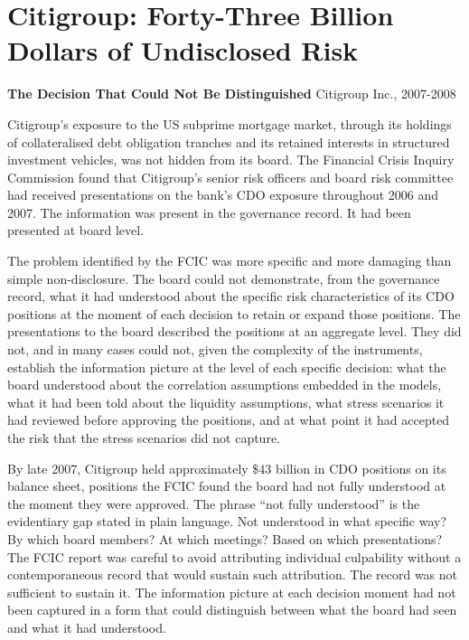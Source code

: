 \scenebreak

\section{Citigroup: Forty-Three Billion Dollars of Undisclosed Risk}

\textbf{The Decision That Could Not Be Distinguished} Citigroup Inc., 2007-2008

Citigroup's exposure to the US subprime mortgage market, through its holdings of collateralised debt obligation tranches and its retained interests in structured investment vehicles, was not hidden from its board. The Financial Crisis Inquiry Commission found that Citigroup's senior risk officers and board risk committee had received presentations on the bank's CDO exposure throughout 2006 and 2007. The information was present in the governance record. It had been presented at board level.

The problem identified by the FCIC was more specific and more damaging than simple non-disclosure. The board could not demonstrate, from the governance record, what it had understood about the specific risk characteristics of its CDO positions at the moment of each decision to retain or expand those positions. The presentations to the board described the positions at an aggregate level. They did not, and in many cases could not, given the complexity of the instruments, establish the information picture at the level of each specific decision: what the board understood about the correlation assumptions embedded in the models, what it had been told about the liquidity assumptions, what stress scenarios it had reviewed before approving the positions, and at what point it had accepted the risk that the stress scenarios did not capture.

By late 2007, Citigroup held approximately \$43 billion in CDO positions on its balance sheet, positions the FCIC found the board had not fully understood at the moment they were approved. The phrase ``not fully understood'' is the evidentiary gap stated in plain language. Not understood in what specific way? By which board members? At which meetings? Based on which presentations? The FCIC report was careful to avoid attributing individual culpability without a contemporaneous record that would sustain such attribution. The record was not sufficient to sustain it. The information picture at each decision moment had not been captured in a form that could distinguish between what the board had seen and what it had understood.

